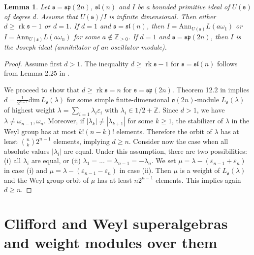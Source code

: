 \documentclass[12pt]{amsart}
\makeatletter
\def\@putname#1#2#3#4{\def\@@ref{#3}\let\old@bf\bf
        \def\bf##1{\old@bf\if?\noexpand##1?{#4}\else##1\fi}%
	#1{#2}%
        \let\bf\old@bf}
\def\@putname#1#2#3#4{\def\@@ref{#3}\let\old@bf\bf	%
	\let\old@reset@font\reset@font			%
        \def\bf##1{\old@bf\if?\noexpand##1?{#4}\else##1\fi}%
	\def\reset@font##1##2{\old@reset@font##1\if?\noexpand##2?{#4}\else##2\fi}#1{#2}%
        \let\bf\old@bf\let\reset@font\old@reset@font}
\let\my@cite=\cite
\def\cite#1{\@putname\my@cite{#1}{\@citeb}{\tiny\rm\@@ref}}
\theoremstyle{plain} %
\numberwithin{equation}{section}
\theoremstyle{definition}
\theoremstyle{remark}
\theoremstyle{plain} %
\newtheorem{lemma}[definition]{Lemma}
\renewcommand{\sp}{\mathfrak{sp}}
\newcommand{\so}{\mathfrak{o}}
\renewcommand{\sl}{\mathfrak{sl}}
\renewcommand{\dim}{\mathrm{dim}}
\newcommand{\Ann}{\mathrm{Ann}}
\newcommand{\Z}{\mathbb{Z}}
\newcommand{\gs}{\mathfrak{s}}
\def\gs{\mathfrak{s}}
\makeatother
\begin{document}
    \begin{lemma}\label{finiterank} Let $\gs=\sp(2n)$, $\sl(n)$ and $I$ be a bounded primitive ideal of $U(\gs)$ of degree $d$. Assume that $U(\gs)/I$ is infinite dimensional. Then either $d\geq  \operatorname{rk}\gs - 1$ or $d=1$. If $d=1$ and $\gs=\sl(n)$, then $I=\Ann_{U(\gs)} L(a\omega_1)$ or
      $I=\Ann_{U(\gs)} L(a\omega_n)$ for some  $a\notin\mathbb Z_{\geq 0}$. If $d=1$ and $\gs=\sp(2n)$, then $I$ is  the Joseph ideal (annihilator of an oscillator module).  %
\end{lemma}
\begin{proof} Assume first  $d>1$. The inequality $d\geq  \operatorname{rk}\gs - 1$   for $\gs=\sl(n)$  follows from Lemma 2.25 in \cite{GrP}. 

We proceed to show that $d \geq  \operatorname{rk}\gs  = n$ for  $\gs=\sp(2n)$. Theorem 12.2 in \cite{Mat} implies $d = \frac{1}{2^{n-1}}\dim \, L_{\so}(\lambda) $ for some simple finite-dimensional $\so (2n)$-module $L_{\so}(\lambda)$ of highest weight $\lambda = \sum_{i=1}\lambda_i \varepsilon_i$ with $\lambda_i \in 1/2 + \Z$. Since $d>1$, we have $\lambda \neq \omega_{n-1}, \omega_{n}$. Moreover, if $|\lambda_k | \neq | \lambda_{k+1} |$ for some $k\geq 1$, the stabilizer of $\lambda$ in the Weyl group has at most $k! (n-k)!$  elements. Therefore the orbit of $\lambda$ has at least $\binom{n}{k}2^{n-1}$ elements, implying $d \geq n$. Consider now the case when all absolute values $|\lambda_i |$ are equal. Under this assumption, there are  two possibilities: (i) all $\lambda_i$ are equal, or (ii) $\lambda_1=...= \lambda_{n-1} = - \lambda_n$. We set $\mu = \lambda - (\varepsilon_{n-1} +\varepsilon_{n})$ in case (i) and $\mu = \lambda - (\varepsilon_{n-1} -\varepsilon_{n})$ in case (ii). Then $\mu$ is a weight of $L_{\so}(\lambda)$ and  the  Weyl group orbit of $\mu$ has at least  $n 2^{n-1}$ elements. This implies again  $d \geq n$.
  \end{proof}  




    
\section{Clifford and Weyl superalgebras and weight modules over them} \label{sec-clif-weyl}
\end{document}
